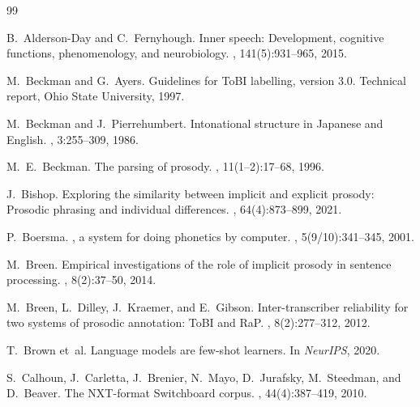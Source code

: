\documentclass[11pt,letterpaper]{article}
\begin{document}
\begin{thebibliography}{99}\small

B.~Alderson-Day and C.~Fernyhough.
\newblock Inner speech: Development, cognitive functions, phenomenology, and neurobiology.
, 141(5):931--965, 2015.

M.~Beckman and G.~Ayers.
\newblock Guidelines for ToBI labelling, version 3.0.
\newblock Technical report, Ohio State University, 1997.

M.~Beckman and J.~Pierrehumbert.
\newblock Intonational structure in {Japanese} and {English}.
, 3:255--309, 1986.

M.~E.\ Beckman.
\newblock The parsing of prosody.
, 11(1--2):17--68, 1996.

J.~Bishop.
\newblock Exploring the similarity between implicit and explicit prosody: Prosodic phrasing and individual differences.
, 64(4):873--899, 2021.

P.~Boersma.
, a system for doing phonetics by computer.
, 5(9/10):341--345, 2001.

M.~Breen.
\newblock Empirical investigations of the role of implicit prosody in sentence processing.
, 8(2):37--50, 2014.

M.~Breen, L.~Dilley, J.~Kraemer, and E.~Gibson.
\newblock Inter-transcriber reliability for two systems of prosodic annotation: {ToBI} and {RaP}.
, 8(2):277--312, 2012.

T.~Brown et~al.
\newblock Language models are few-shot learners.
\newblock In {\em NeurIPS}, 2020.

S.~Calhoun, J.~Carletta, J.~Brenier, N.~Mayo, D.~Jurafsky, M.~Steedman, and D.~Beaver.
\newblock The {NXT}-format Switchboard corpus.
, 44(4):387--419, 2010.


\end{thebibliography}
\end{document}
